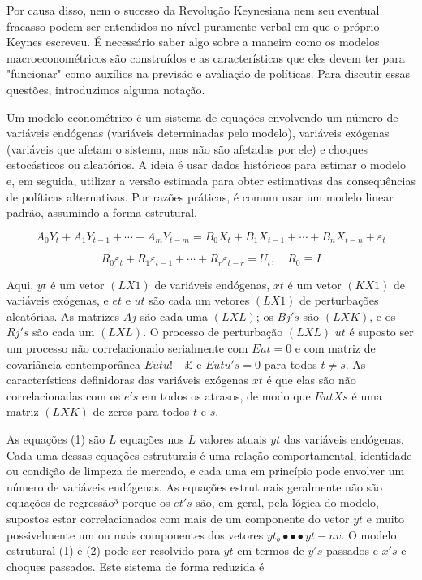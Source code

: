 \documentclass[12pt]{article}
\begin{document}
Por causa disso, nem o sucesso da Revolução Keynesiana nem seu eventual fracasso podem ser entendidos no nível puramente verbal em que o próprio Keynes escreveu. É necessário saber algo sobre a maneira como os modelos macroeconométricos são construídos e as características que eles devem ter para "funcionar" como auxílios na previsão e avaliação de políticas. Para discutir essas questões, introduzimos alguma notação.

Um modelo econométrico é um sistema de equações envolvendo um número de variáveis endógenas (variáveis determinadas pelo modelo), variáveis exógenas (variáveis que afetam o sistema, mas não são afetadas por ele) e choques estocásticos ou aleatórios. A ideia é usar dados históricos para estimar o modelo e, em seguida, utilizar a versão estimada para obter estimativas das consequências de políticas alternativas. Por razões práticas, é comum usar um modelo linear padrão, assumindo a forma estrutural.

\begin{equation}
    A_0 Y_t + A_1 Y_{t-1} + \cdots + A_m Y_{t-m} = B_0 X_t + B_1 X_{t-1} + \cdots + B_n X_{t-n} + \varepsilon_t
\end{equation}

\begin{equation}
    R_0 \varepsilon_t + R_1 \varepsilon_{t-1} + \cdots + R_r \varepsilon_{t-r} = U_t, \quad R_0 \equiv I
\end{equation}

Aqui, $yt$ é um vetor $(LX1)$ de variáveis endógenas, $xt$ é um vetor $(KX1)$ de variáveis exógenas, e $et$ e $ut$ são cada um vetores $(LX1)$ de perturbações aleatórias. As matrizes $Aj$ são cada uma $(LXL)$; os $Bj's$ são $(LXK)$, e os $Rj's$ são cada um $(LXL)$. O processo de perturbação $(LXL)$ $ut$ é suposto ser um processo não correlacionado serialmente com $Eut = 0$ e com matriz de covariância contemporânea $Eutu! — £$ e $Eutu's = 0$ para todos $t ≠ s$. As características definidoras das variáveis exógenas $xt$ é que elas são não correlacionadas com os $e's$ em todos os atrasos, de modo que $EutXs$ é uma matriz $(LXK)$ de zeros para todos $t$ e $s$.

As equações (1) são $L$ equações nos $L$ valores atuais $yt$ das variáveis endógenas. Cada uma dessas equações estruturais é uma relação comportamental, identidade ou condição de limpeza de mercado, e cada uma em princípio pode envolver um número de variáveis endógenas. As equações estruturais geralmente não são equações de regressão³ porque os $et's$ são, em geral, pela lógica do modelo, supostos estar correlacionados com mais de um componente do vetor $yt$ e muito possivelmente um ou mais componentes dos vetores $yt_ b • • • yt-nv$. O modelo estrutural (1) e (2) pode ser resolvido para $yt$ em termos de $y's$ passados e $x's$ e choques passados. Este sistema de forma reduzida é
\end{document}
